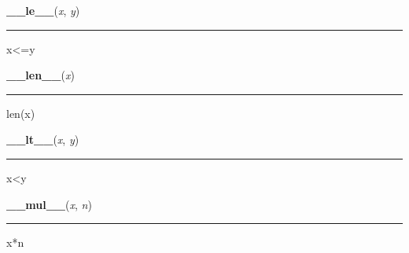     \begin{boxedminipage}{\textwidth}

    \raggedright \textbf{\_\_le\_\_}(\textit{x}, \textit{y})

    \vspace{-1.5ex}

    \rule{\textwidth}{0.5\fboxrule}

x{\textless}=y
    \vspace{1ex}

    \end{boxedminipage}

    \label{list:__len__}

    \vspace{0.5ex}

    \begin{boxedminipage}{\textwidth}

    \raggedright \textbf{\_\_len\_\_}(\textit{x})

    \vspace{-1.5ex}

    \rule{\textwidth}{0.5\fboxrule}

len(x)
    \vspace{1ex}

    \end{boxedminipage}

    \label{list:__lt__}

    \vspace{0.5ex}

    \begin{boxedminipage}{\textwidth}

    \raggedright \textbf{\_\_lt\_\_}(\textit{x}, \textit{y})

    \vspace{-1.5ex}

    \rule{\textwidth}{0.5\fboxrule}

x{\textless}y
    \vspace{1ex}

    \end{boxedminipage}

    \label{list:__mul__}

    \vspace{0.5ex}

    \begin{boxedminipage}{\textwidth}

    \raggedright \textbf{\_\_mul\_\_}(\textit{x}, \textit{n})

    \vspace{-1.5ex}

    \rule{\textwidth}{0.5\fboxrule}

x*n
    \vspace{1ex}

    \end{boxedminipage}


